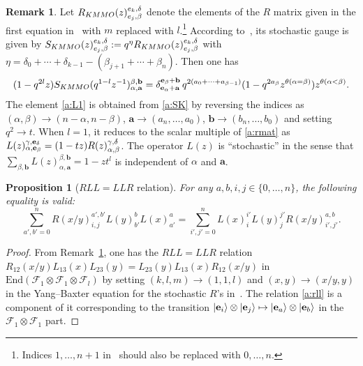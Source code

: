 \documentclass[11pt]{article}
\newtheorem{prop}[theo]{Proposition}
\theoremstyle{definition}
\newtheorem{rema}[theo]{Remark}
\numberwithin{equation}{section}
\newcommand{\eb}{\rm{\bf e}}
\newcommand{\F}{\mathcal{F}}
\newcommand{\ket}[1]{\lvert #1 \rangle}
\newcommand{\aaa}{\mathbf{a}}
\newcommand{\bb}{\mathbf{b}}
\begin{document}
\begin{rema}\label{a:re:L}
Let $R_{\rm KMMO}(z)^{e_k, \delta}_{e_j, \beta}$ denote the elements 
of the $R$ matrix given in the first equation in~\cite[App.A]{KMMO} with 
$m$ replaced with $l$.\footnote{Indices $1,\ldots, n+1$ in~\cite{KMMO} should also be 
replaced with $0,\ldots, n$.}
According to~\cite[Eqs.(15),(16)]{KMMO},  its stochastic gauge is given by 
$S_{\rm KMMO}(z)^{e_k, \delta}_{e_j, \beta}:=
q^\eta R_{\rm KMMO}(z)^{e_k, \delta}_{e_j, \beta}$ with 
$\eta = \delta_0+\cdots + \delta_{k-1} - (\beta_{j+1}+ \cdots + \beta_n)$.
Then one has  
\begin{align}\label{a:SK}
(1-q^{2l}z)S_{\rm KMMO}(q^{1-l}z^{-1})^{\beta, \bb}_{\alpha, \aaa}
=
\delta_{ {\bf e}_\alpha +\aaa}^{ {\bf e}_\beta+ \bb}\,q^{2(a_0+ \cdots + a_{\beta-1})}(1-q^{2a_\beta}z^{\theta(\alpha=\beta)})z^{\theta(\alpha<\beta)}.
\end{align}
The element \eqref{a:L1} is obtained from \eqref{a:SK}  by reversing the indices as 
$(\alpha, \beta) \rightarrow (n-\alpha, n-\beta)$, 
$\aaa \rightarrow (a_n,\ldots, a_0)$, 
$\bb \rightarrow (b_n,\ldots, b_0)$ and setting $q^2 \rightarrow t$.
%
When $l=1$, it reduces to the scalar multiple of \eqref{a:rmat} 
as $L(z)^{\gamma, \eb_\delta}_{\alpha, \eb_\beta}=(1-tz)R(z)^{\gamma, \delta}_{\alpha, \beta}$.
The operator $L(z)$ is ``stochastic'' in the sense that 
$\sum_{\beta, \bb} L(z)^{\beta, \bb}_{\alpha, \aaa} = 1-z t^l$ is independent of 
$\alpha$ and $\aaa$.
\end{rema}

\begin{prop}[$RLL=LLR$ relation]\label{a:pr:RLL}
For any $a,b,i,j \in \{0,\ldots, n\}$, the following equality is valid:
\begin{equation}\label{a:rll}
\sum_{a',b'=0}^nR(x/y)_{i, j}^{a', b'}L(y)_{b'}^bL(x)_{a'}^a
=\sum_{i',j'=0}^nL(x)_i^{i'}L(y)_j^{j'}R(x/y)_{i', j'}^{a, b}.
\end{equation}
\end{prop}
\begin{proof}
From Remark~\ref{a:re:L}, one has the $RLL=LLR$ relation
$R_{12}(x/y)L_{13}(x)L_{23}(y) = L_{23}(y)L_{13}(x)R_{12}(x/y)$ 
in $\mathrm{End}(\F_1 \otimes \F_1 \otimes \F_l)$
by  setting $(k,l,m) \rightarrow (1,1,l)$ and 
$(x,y)\rightarrow (x/y,y)$ in the Yang--Baxter equation for the stochastic $R$'s 
in~\cite[Prop.~4]{KMMO}.
The relation \eqref{a:rll} is a component of it corresponding to the transition
$\ket{{\bf e}_i} \otimes \ket{{\bf e}_j}  \mapsto \ket{{\bf e}_a} \otimes \ket{{\bf e}_b}$ 
in the $\F_1 \otimes \F_1$ part.
\end{proof}
\end{document}
